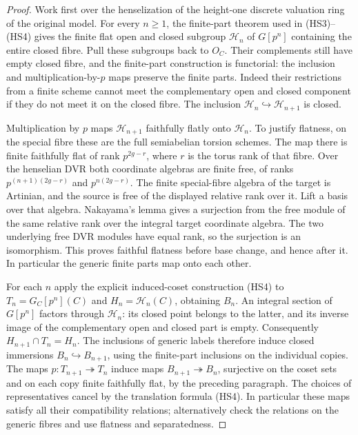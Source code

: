 \begin{proof}
Work first over the henselization of the height-one discrete valuation
ring of the original model. For every \(n\ge1\), the finite-part theorem
used in (HS3)--(HS4) gives the finite flat open and closed subgroup
\(\mathcal H_n\) of \(G[p^n]\) containing the entire closed fibre.
Pull these subgroups back to \(O_C\). Their complements still have
empty closed fibre, and the finite-part construction is functorial:
the inclusion and multiplication-by-\(p\) maps preserve the finite
parts. Indeed their restrictions from a finite scheme cannot meet
the complementary open and closed component if they do not meet
it on the closed fibre. The inclusion
\(\mathcal H_n\hookrightarrow\mathcal H_{n+1}\) is closed.

Multiplication by \(p\) maps \(\mathcal H_{n+1}\) faithfully flatly
onto \(\mathcal H_n\). To justify flatness, on the special fibre
these are the full semiabelian torsion schemes. The map there is
finite faithfully flat of rank \(p^{2g-r}\), where \(r\) is the
torus rank of that fibre. Over the henselian DVR both coordinate
algebras are finite free, of ranks \(p^{(n+1)(2g-r)}\) and
\(p^{n(2g-r)}\). The finite special-fibre algebra of the target is
Artinian, and the source is free of the displayed relative rank
over it. Lift a basis over that algebra. Nakayama's lemma gives
a surjection from the free module of the same relative rank over
the integral target coordinate algebra. The two underlying free
DVR modules have equal rank, so the surjection is an isomorphism.
This proves faithful flatness before base change, and hence after it.
In particular the generic finite parts map onto each other.

For each \(n\) apply the explicit induced-coset construction (HS4)
to \(T_n=G_C[p^n](C)\) and \(H_n=\mathcal H_n(C)\), obtaining \(B_n\).
An integral section of \(G[p^n]\) factors through \(\mathcal H_n\):
its closed point belongs to the latter, and its inverse image of
the complementary open and closed part is empty. Consequently
\(H_{n+1}\cap T_n=H_n\). The inclusions of generic labels therefore
induce closed immersions \(B_n\hookrightarrow B_{n+1}\), using the
finite-part inclusions on the individual copies. The maps
\(p:T_{n+1}\twoheadrightarrow T_n\) induce maps
\(B_{n+1}\twoheadrightarrow B_n\), surjective on the coset sets
and on each copy finite faithfully flat, by the preceding paragraph.
The choices of representatives cancel by the translation formula
(HS4). In particular these maps satisfy all their compatibility
relations; alternatively check the relations on the generic fibres
and use flatness and separatedness.


\end{proof}
